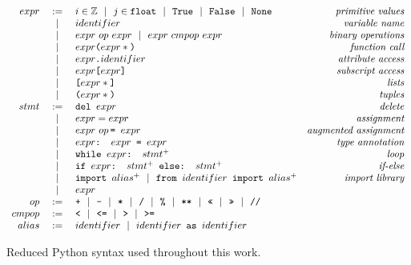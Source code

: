 \begin{figure}
\[\begin{array}{rclr}
    expr  &:=& i \in \mathbb{Z} ~~|~~ j \in \texttt{float} ~~|~~ \texttt{True} ~~|~~
    \texttt{False} ~~|~~ \texttt{None} & \textit{primitive values} \\
     &~~|~~& identifier & \textit{variable name} \\
     &~~|~~& expr~op~expr ~~|~~ expr~cmpop~expr & \textit{binary operations} \\
     &~~|~~& expr\texttt{(}expr*\texttt{)}     & \textit{function call} \\
     &~~|~~& expr\texttt{.}identifier & \textit{attribute access} \\
     &~~|~~& expr\texttt{[}expr\texttt{]}      & \textit{subscript access} \\
     &~~|~~& \texttt{[}expr*\texttt{]}         & \textit{lists} \\
     &~~|~~& \texttt{(}expr*\texttt{)}         & \textit{tuples} \\

  stmt &:=& \texttt{del } expr  & \textit{delete} \\
     &~~|~~& expr = expr         & \textit{assignment} \\
     &~~|~~& expr~op\hspace{-0.35em}\texttt{ = } expr       & \textit{augmented assignment} \\
     &~~|~~& expr\texttt{: } expr \texttt{ = } expr         & \textit{type annotation} \\
     &~~|~~& \texttt{while } expr\texttt{: } stmt^+         & \textit{loop} \\
     &~~|~~& \texttt{if } expr\texttt{: } stmt^+ \texttt{ else: } stmt^+  & \textit{if-else} \\
     &~~|~~& \texttt{import } alias^+
     ~~|~~ \texttt{from } identifier \texttt{ import } alias^+   & \textit{import library} \\
     &~~|~~& expr & \\

  op &:=& \texttt{+} ~~|~~ \texttt{-} ~~|~~ \texttt{*} ~~|~~ \texttt{/} ~~|~~ \texttt{\%} ~~|~~ \texttt{**} ~~|~~
      \texttt{<<} ~~|~~ \texttt{>>} ~~|~~ \texttt{//}  & \\
  cmpop &:=& \texttt{<} ~~|~~ \texttt{<=} ~~|~~ \texttt{>} ~~|~~ \texttt{>=}  & \\

  alias &:=& identifier ~~|~~ identifier \texttt{ as } identifier  & \\

\end{array}\]
\caption{Reduced Python syntax used throughout this work.\label{syntaxPython}}
\end{figure}

